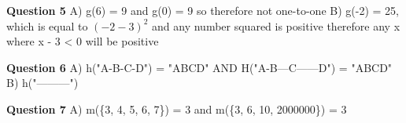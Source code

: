 \documentclass{article}
\begin{document}
\textbf{Question 5}\newline
A) g(6) = 9 and g(0) = 9 so therefore not one-to-one\newline
B) g(-2) = 25, which is equal to ${(-2 - 3)^2}$ and any number squared is positive therefore any x where x - 3 < 0 will be positive\newline\newline

\textbf{Question 6}\newline
A) h("A-B-C-D") = "ABCD" AND H("A-B---C------D") = "ABCD"\newline
B) h("---------") \newline\newline

\textbf{Question 7}\newline
A) m(\{3, 4, 5, 6, 7\}) = 3 and m(\{3, 6, 10, 2000000\}) = 3

\enddocument
\end{document}
